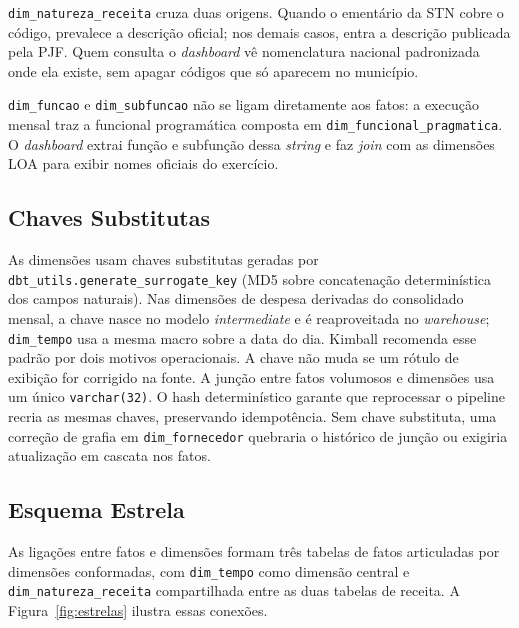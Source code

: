 \texttt{dim\_natureza\_receita} cruza duas origens. Quando o ementário da STN cobre o código, prevalece a descrição oficial; nos demais casos, entra a descrição publicada pela PJF. Quem consulta o \textit{dashboard} vê nomenclatura nacional padronizada onde ela existe, sem apagar códigos que só aparecem no município.

\texttt{dim\_funcao} e \texttt{dim\_subfuncao} não se ligam diretamente aos fatos: a execução mensal traz a funcional programática composta em \texttt{dim\_funcional\_pragmatica}. O \textit{dashboard} extrai função e subfunção dessa \textit{string} e faz \textit{join} com as dimensões LOA para exibir nomes oficiais do exercício.

\subsection{Chaves Substitutas}

As dimensões usam chaves substitutas geradas por \texttt{dbt\_utils.generate\_surrogate\_key} (MD5 sobre concatenação determinística dos campos naturais). Nas dimensões de despesa derivadas do consolidado mensal, a chave nasce no modelo \textit{intermediate} e é reaproveitada no \textit{warehouse}; \texttt{dim\_tempo} usa a mesma macro sobre a data do dia. Kimball recomenda esse padrão por dois motivos operacionais. A chave não muda se um rótulo de exibição for corrigido na fonte. A junção entre fatos volumosos e dimensões usa um único \texttt{varchar(32)}. O hash determinístico garante que reprocessar o pipeline recria as mesmas chaves, preservando idempotência. Sem chave substituta, uma correção de grafia em \texttt{dim\_fornecedor} quebraria o histórico de junção ou exigiria atualização em cascata nos fatos.

\subsection{Esquema Estrela}

As ligações entre fatos e dimensões formam três tabelas de fatos articuladas por dimensões conformadas, com \texttt{dim\_tempo} como dimensão central e \texttt{dim\_natureza\_receita} compartilhada entre as duas tabelas de receita. A Figura~\ref{fig:estrelas} ilustra essas conexões.

